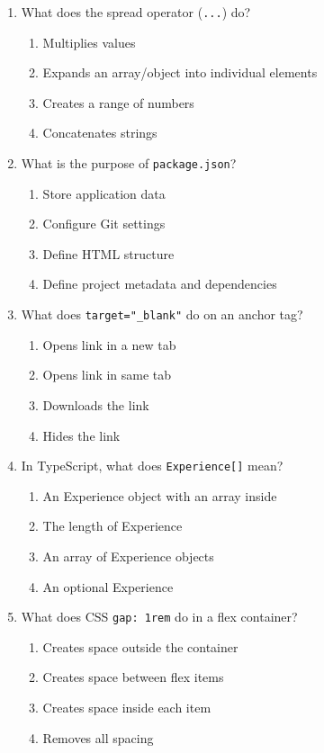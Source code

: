 \documentclass[12pt,a4paper]{article}
\begin{document}
\begin{enumerate}
\item What does the spread operator (\texttt{...}) do?
\begin{enumerate}[label=\Alph*)]
    \item Multiplies values
    \item Expands an array/object into individual elements
    \item Creates a range of numbers
    \item Concatenates strings
\end{enumerate}

\item What is the purpose of \texttt{package.json}?
\begin{enumerate}[label=\Alph*)]
    \item Store application data
    \item Configure Git settings
    \item Define HTML structure
    \item Define project metadata and dependencies
\end{enumerate}

\item What does \texttt{target="\_blank"} do on an anchor tag?
\begin{enumerate}[label=\Alph*)]
    \item Opens link in a new tab
    \item Opens link in same tab
    \item Downloads the link
    \item Hides the link
\end{enumerate}

\item In TypeScript, what does \texttt{Experience[]} mean?
\begin{enumerate}[label=\Alph*)]
    \item An Experience object with an array inside
    \item The length of Experience
    \item An array of Experience objects
    \item An optional Experience
\end{enumerate}

\item What does CSS \texttt{gap: 1rem} do in a flex container?
\begin{enumerate}[label=\Alph*)]
    \item Creates space outside the container
    \item Creates space between flex items
    \item Creates space inside each item
    \item Removes all spacing
\end{enumerate}


\end{enumerate}
\end{document}
